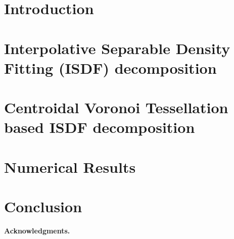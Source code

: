 



\section{Introduction}\label{cvtsec:int}
	

\section{Interpolative Separable Density Fitting (ISDF) decomposition}
	\label{cvtsec:bac}
	

\section{Centroidal Voronoi Tessellation based ISDF decomposition}
	\label{cvtsec:met}
	

\section{Numerical Results}\label{cvtsec:num}
	

\section{Conclusion}\label{cvtsec:con}
	
	
\vfill

\noindent\textbf{Acknowledgments.} 